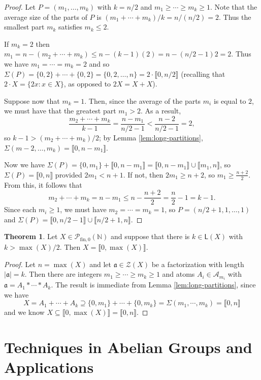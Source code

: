 \documentclass{report}
\newcommand{\A}{\mathcal{A}}
\renewcommand{\aa}{\mathfrak{a}}
\newcommand{\NN}{\mathbb{N}}
\renewcommand{\P}{\mathcal{P}}
\newcommand{\Z}{\mathcal{Z}}
\newcommand{\llb}{\llbracket}
\newcommand{\rrb}{\rrbracket}
\newcommand{\fin}{\textrm{fin}}
\renewcommand{\:}{\text{:}}
\newcommand{\PN}{{\P_{\fin,0}(\NN)}}
\theoremstyle{definition}
\newtheorem{thm}[defn]{Theorem}
\begin{document}
\begin{proof}
	Let $P = (m_1,\dots, m_k)$ with $k=n/2$ and $m_1\ge \cdots \ge m_k \ge 1$.
	Note that the average size of the parts of $P$ is $(m_1+\cdots+m_k)/k = n/(n/2) = 2$.
	Thus the smallest part $m_k$ satisfies $m_k \le 2$.
	
	If $m_k = 2$ then $m_1 = n - (m_2+\cdots+m_k) \le n - (k-1)(2) = n - (n/2-1)2 = 2$.
	Thus we have $m_1 = \cdots = m_k = 2$ and so $\Sigma(P) = \{0,2\}+\cdots+\{0,2\} = \{0,2,\dots,n\} = 2\cdot\llb0,n/2\rrb$ (recalling that $2\cdot X = \{2x: x\in X\}$, as opposed to $2X = X+X$).
	
	Suppose now that $m_k=1$.
	Then, since the average of the parts $m_i$ is equal to $2$, we must have that the greatest part $m_1 > 2$.
	As a result, 
	\[\frac{m_2+\cdots+m_k}{k-1} = \frac{n-m_1}{n/2-1} < \frac{n-2}{n/2-1} = 2, \]
	so $k-1 > (m_2 + \cdots + m_k)/2$; by Lemma \ref{lem:long-partitions}, $\Sigma(m-2,\dots,m_k) = \llb 0, n-m_1 \rrb$.
	
	Now we have $\Sigma(P) = \{0,m_1\} + \llb 0,n-m_1\rrb = \llb 0,n-m_1 \rrb \cup \llb m_1, n\rrb$, so $\Sigma(P) = \llb 0,n \rrb$ provided $2m_1 < n+1$.
	If not, then $2m_1 \ge n+2$, so $m_1 \ge \frac{n+2}{2}$.
	From this, it follows that 
	\[m_2 +\cdots+m_k = n-m_1 \le n - \frac{n+2}{2} = \frac{n}{2}-1 = k-1.\]
	Since each $m_i \ge 1$, we must have $m_2 = \cdots = m_k = 1$, so $P = (n/2+1, 1,\dots, 1)$ and $\Sigma(P) = \llb 0,n/2-1 \rrb \cup \llb n/2+1,n\rrb$.
\end{proof}

\begin{thm}
	Let $X \in \PN$ and suppose that there is $k\in \mathsf{L}(X)$ with $k > \max(X)/2$.
	Then $X = \llb 0, \max(X) \rrb$.
\end{thm}

\begin{proof}
	Let $n = \max(X)$ and let $\aa\in\Z(X)$ be a factorization with length $|\aa| = k$.
	Then there are integers $m_1\ge\cdots \ge m_k \ge 1$ and atoms $A_i\in \A_{m_i}$ with $\aa = A_1*\cdots*A_k$.
	The result is immediate from Lemma \ref{lem:long-partitions}, since we have
	\[ X = A_1 + \cdots + A_k \supseteq \{0,m_1\} + \cdots + \{0,m_k\} = \Sigma(m_1,\cdots,m_k) = \llb 0,n \rrb \]
	and we know $X \subseteq \llb 0,\max(X) \rrb = \llb 0, n \rrb$.
\end{proof}

\chapter{Techniques in Abelian Groups and Applications} \label{ch:applications}
\end{document}
